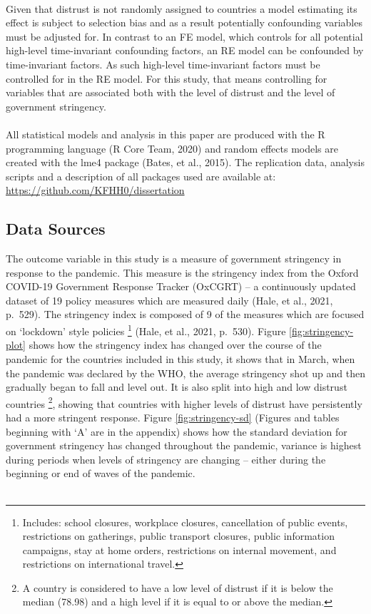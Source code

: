 \documentclass[
  11pt,
]{article}
\begin{document}
~\\
Given that distrust is not randomly assigned to countries a model estimating its effect is subject to selection bias and as a result potentially confounding variables must be adjusted for. In contrast to an FE model, which controls for all potential high-level time-invariant confounding factors, an RE model can be confounded by time-invariant factors. As such high-level time-invariant factors must be controlled for in the RE model. For this study, that means controlling for variables that are associated both with the level of distrust and the level of government stringency.\\
~\\
All statistical models and analysis in this paper are produced with the R programming language (R Core Team, 2020) and random effects models are created with the lme4 package (Bates, et al., 2015). The replication data, analysis scripts and a description of all packages used are available at: \url{https://github.com/KFHH0/dissertation}\\

\hypertarget{data-sources}{%
\subsection{Data Sources}\label{data-sources}}

The outcome variable in this study is a measure of government stringency in response to the pandemic. This measure is the stringency index from the Oxford COVID-19 Government Response Tracker (OxCGRT) -- a continuously updated dataset of 19 policy measures which are measured daily (Hale, et al., 2021, p.~529). The stringency index is composed of 9 of the measures which are focused on `lockdown' style policies \footnote{Includes: school closures, workplace closures, cancellation of public events, restrictions on gatherings, public transport closures, public information campaigns, stay at home orders, restrictions on internal movement, and restrictions on international travel.} (Hale, et al., 2021, p.~530). Figure \ref{fig:stringency-plot} shows how the stringency index has changed over the course of the pandemic for the countries included in this study, it shows that in March, when the pandemic was declared by the WHO, the average stringency shot up and then gradually began to fall and level out. It is also split into high and low distrust countries \footnote{A country is considered to have a low level of distrust if it is below the median (78.98) and a high level if it is equal to or above the median.}, showing that countries with higher levels of distrust have persistently had a more stringent response. Figure \ref{fig:stringency-sd} (Figures and tables beginning with `A' are in the appendix) shows how the standard deviation for government stringency has changed throughout the pandemic, variance is highest during periods when levels of stringency are changing -- either during the beginning or end of waves of the pandemic.\\
~\\
\end{document}
